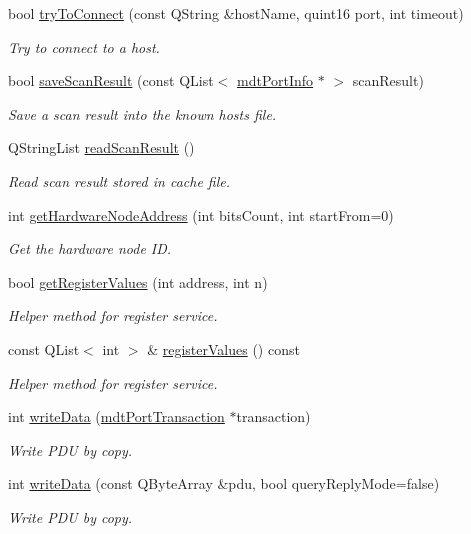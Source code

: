 \begin{DoxyCompactItemize}
bool \hyperlink{classmdt_modbus_tcp_port_manager_ab04f69b660487a7c59d309df7a8f5baa}{tryToConnect} (const QString \&hostName, quint16 port, int timeout)
\begin{DoxyCompactList}\small\item\em Try to connect to a host. \end{DoxyCompactList}\item 
bool \hyperlink{classmdt_modbus_tcp_port_manager_a3a1f5a54c93fa90ba83dea8785407da3}{saveScanResult} (const QList$<$ \hyperlink{classmdt_port_info}{mdtPortInfo} $\ast$ $>$ scanResult)
\begin{DoxyCompactList}\small\item\em Save a scan result into the known hosts file. \end{DoxyCompactList}\item 
QStringList \hyperlink{classmdt_modbus_tcp_port_manager_ab4d0a994973af6008faf489ca9ddb03d}{readScanResult} ()
\begin{DoxyCompactList}\small\item\em Read scan result stored in cache file. \end{DoxyCompactList}\item 
int \hyperlink{classmdt_modbus_tcp_port_manager_a4f52a477c264f809984e25abbc856db8}{getHardwareNodeAddress} (int bitsCount, int startFrom=0)
\begin{DoxyCompactList}\small\item\em Get the hardware node ID. \end{DoxyCompactList}\item 
bool \hyperlink{classmdt_modbus_tcp_port_manager_ab5e780409492b5f56326a870bc4262ec}{getRegisterValues} (int address, int n)
\begin{DoxyCompactList}\small\item\em Helper method for register service. \end{DoxyCompactList}\item 
const QList$<$ int $>$ \& \hyperlink{classmdt_modbus_tcp_port_manager_a99a13b5250a8523aa63869991581e56a}{registerValues} () const 
\begin{DoxyCompactList}\small\item\em Helper method for register service. \end{DoxyCompactList}\item 
int \hyperlink{classmdt_modbus_tcp_port_manager_afdee5f0444f7f6b258a23733cc134684}{writeData} (\hyperlink{classmdt_port_transaction}{mdtPortTransaction} $\ast$transaction)
\begin{DoxyCompactList}\small\item\em Write PDU by copy. \end{DoxyCompactList}\item 
int \hyperlink{classmdt_modbus_tcp_port_manager_a5e687204475d788170b9b61a1f06eecf}{writeData} (const QByteArray \&pdu, bool queryReplyMode=false)
\begin{DoxyCompactList}\small\item\em Write PDU by copy. \end{DoxyCompactList}\end{DoxyCompactItemize}


